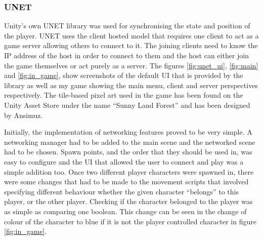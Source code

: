 \subsubsection{UNET}
Unity's own UNET library was used for synchronising the state and position of the player. UNET uses the client hosted model that requires one client to act as a game server allowing others to connect to it. The joining clients need to know the IP address of the host in order to connect to them and the host can either join the game themselves or act purely as a server. The figures \ref{fig:unet_ui}, \ref{fig:main} and \ref{fig:in_game}, show screenshots of the default UI that is provided by the library as well as my game showing the main menu, client and server perspectives respectively. The tile-based pixel art used in the game has been found on the Unity Asset Store under the name ``Sunny Land Forest'' and has been designed by Ansimuz.

Initially, the implementation of networking features proved to be very simple. A networking manager had to be added to the main scene and the networked scene had to be chosen. Spawn points, and the order that they should be used in, was easy to configure and the UI that allowed the user to connect and play was a simple addition too. Once two different player characters were spawned in, there were some changes that had to be made to the movement scripts that involved specifying different behaviour whether the given character ``belongs'' to this player, or the other player. Checking if the character belonged to the player was as simple as comparing one boolean. This change can be seen in the change of colour of the character to blue if it is not the player controlled character in figure \ref{fig:in_game}.

